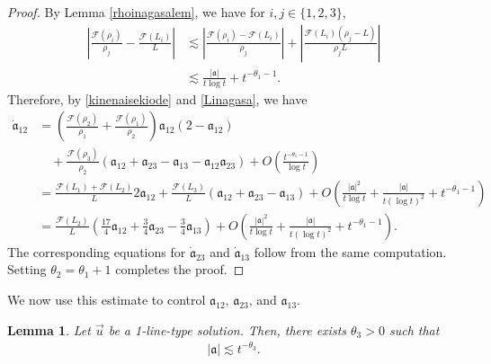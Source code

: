 \documentclass[10pt,a4paper]{amsart}
\newtheorem{lemma}[theorem]{Lemma}
\numberwithin{equation}{section}
\begin{document}
\begin{proof}
By Lemma \ref{rhoinagasalem}, we have for $i,j\in\{1,2,3\}$,
\begin{align*}
\left|\frac{\mathcal{F}(\rho_i)}{\rho_j}-\frac{\mathcal{F}(L_i)}{L}\right|&\lesssim \left|\frac{\mathcal{F}(\rho_i)-\mathcal{F}(L_i)}{\rho_j}\right|+\left|\frac{\mathcal{F}(L_i)(\rho_j-L)}{\rho_jL}\right|
\\
&\lesssim \frac{|\mathfrak{a}|}{t\log{t}}+t^{-\theta_1-1}.
\end{align*}
Therefore, by \eqref{kinenaisekiode} and \eqref{Linagasa}, we have
\begin{align*}
\dot{\mathfrak{a}}_{12}&=\left(\frac{\mathcal{F}(\rho_2)}{\rho_1}+\frac{\mathcal{F}(\rho_1)}{\rho_2}\right)\mathfrak{a}_{12}\left(2-\mathfrak{a}_{12}\right)
\\
&\quad+\frac{\mathcal{F}(\rho_3)}{\rho_2}\left(\mathfrak{a}_{12}+\mathfrak{a}_{23}-\mathfrak{a}_{13}-\mathfrak{a}_{12}\mathfrak{a}_{23}\right)+O\left(\frac{t^{-\theta_1-1}}{\log{t}}\right)
\\
&=\frac{\mathcal{F}(L_1)+\mathcal{F}(L_2)}{L}2\mathfrak{a}_{12}+\frac{\mathcal{F}(L_3)}{L}\left(\mathfrak{a}_{12}+\mathfrak{a}_{23}-\mathfrak{a}_{13}\right)+O\left(\frac{|\mathfrak{a}|^2}{t\log{t}}+\frac{|\mathfrak{a}|}{t(\log{t})^2}+t^{-\theta_1-1}\right)
\\
&=\frac{\mathcal{F}(L_2)}{L}\left(\frac{17}{4}\mathfrak{a}_{12}+\frac{3}{4}\mathfrak{a}_{23}-\frac{3}{4}\mathfrak{a}_{13}\right)+O\left(\frac{|\mathfrak{a}|^2}{t\log{t}}+\frac{|\mathfrak{a}|}{t(\log{t})^2}+t^{-\theta_1-1}\right).
\end{align*}
The corresponding equations for $\dot{\mathfrak{a}}_{23}$ and $\dot{\mathfrak{a}}_{13}$ follow from the same computation. Setting $\theta_2=\theta_1+1$ completes the proof.
\end{proof}

We now use this estimate to control $\mathfrak{a}_{12}$, $\mathfrak{a}_{23}$, and $\mathfrak{a}_{13}$.
\begin{lemma}\label{naisekiosaerusharp}
Let $\vec{u}$ be a 1-line-type solution. Then, there exists $\theta_3>0$ such that 
\begin{align}\label{,athfrakasharpes}
|\mathfrak{a}|\lesssim t^{-\theta_3}.
\end{align} 
\end{lemma}
\end{document}
